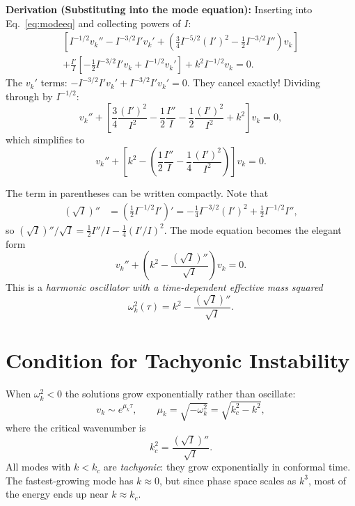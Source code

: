 \documentclass[12pt,a4paper,openany]{book}
\newcommand{\vk}{v_k}
\newcommand{\sqI}{\sqrt{I}}
\newcommand{\kc}{k_c}
\begin{document}
\noindent\textbf{Derivation (Substituting into the mode equation):} Inserting into Eq.~\eqref{eq:modeeq} and collecting powers of $I$:
\begin{multline}
  \left[I^{-1/2}\vk'' - I^{-3/2}I'\vk' + \left(\frac{3}{4}I^{-5/2}(I')^2 - \frac{1}{2}I^{-3/2}I''\right)\vk\right] \\
  + \frac{I'}{I}\left[-\frac{1}{2}I^{-3/2}I'\vk + I^{-1/2}\vk'\right] + k^2 I^{-1/2}\vk = 0.
\end{multline}
The $\vk'$ terms: $-I^{-3/2}I'\vk' + I^{-3/2}I'\vk' = 0$. They cancel exactly! Dividing through by $I^{-1/2}$:
\begin{equation}
  \vk'' + \left[\frac{3}{4}\frac{(I')^2}{I^2} - \frac{1}{2}\frac{I''}{I} - \frac{1}{2}\frac{(I')^2}{I^2} + k^2\right]\vk = 0,
\end{equation}
which simplifies to
\begin{equation}
  \vk'' + \left[k^2 - \left(\frac{1}{2}\frac{I''}{I} - \frac{1}{4}\frac{(I')^2}{I^2}\right)\right]\vk = 0.
\end{equation}

The term in parentheses can be written compactly. Note that
\begin{align}
  (\sqI)'' &= \left(\frac{1}{2}I^{-1/2}I'\right)' = -\frac{1}{4}I^{-3/2}(I')^2 + \frac{1}{2}I^{-1/2}I'',
\end{align}
so $(\sqI)''/\sqI = \frac{1}{2}I''/I - \frac{1}{4}(I'/I)^2$. The mode equation becomes the elegant form
\begin{equation}
  \boxed{\vk'' + \left(k^2 - \frac{(\sqrt{I})''}{\sqrt{I}}\right)\vk = 0.}
  \label{eq:canonical}
\end{equation}
This is a \emph{harmonic oscillator with a time-dependent effective mass squared}
\begin{equation}
  \omega_k^2(\tau) = k^2 - \frac{(\sqI)''}{\sqI}.
\end{equation}

\section{Condition for Tachyonic Instability}

When $\omega_k^2 < 0$ the solutions grow exponentially rather than oscillate:
\begin{equation}
  \vk \sim e^{\mu_k \tau}, \qquad \mu_k = \sqrt{-\omega_k^2} = \sqrt{\kc^2 - k^2},
\end{equation}
where the critical wavenumber is
\begin{equation}
  \kc^2 = \frac{(\sqI)''}{\sqI}.
\end{equation}
All modes with $k < \kc$ are \emph{tachyonic}: they grow exponentially in conformal time. The fastest-growing mode has $k \approx 0$, but since phase space scales as $k^3$, most of the energy ends up near $k \approx \kc$.
\end{document}
